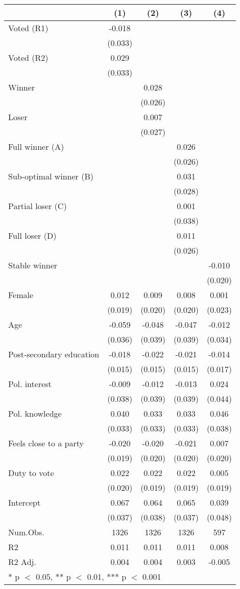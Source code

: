 \begin{table}
\centering
\begin{tabular}[t]{lcccc}
\toprule
  & (1) & (2) & (3) & (4)\\
\midrule
Voted (R1) & -0.018 &  &  & \\
 & (0.033) &  &  \vphantom{1} & \\
Voted (R2) & 0.029 &  &  & \\
 & (0.033) &  &  & \\
Winner &  & 0.028 &  & \\
 &  & (0.026) &  & \\
Loser &  & 0.007 &  & \\
 &  & (0.027) &  & \\
Full winner (A) &  &  & 0.026 & \\
 &  &  & (0.026) \vphantom{1} & \\
Sub-optimal winner (B) &  &  & 0.031 & \\
 &  &  & (0.028) & \\
Partial loser (C) &  &  & 0.001 & \\
 &  &  & (0.038) & \\
Full loser (D) &  &  & 0.011 & \\
 &  &  & (0.026) & \\
Stable winner &  &  &  & -0.010\\
 &  &  &  & (0.020)\\
Female & 0.012 & 0.009 & 0.008 & 0.001\\
 & (0.019) & (0.020) & (0.020) & (0.023)\\
Age & -0.059 & -0.048 & -0.047 & -0.012\\
 & (0.036) & (0.039) & (0.039) & (0.034)\\
Post-secondary education & -0.018 & -0.022 & -0.021 & -0.014\\
 & (0.015) & (0.015) & (0.015) & (0.017)\\
Pol. interest & -0.009 & -0.012 & -0.013 & 0.024\\
 & (0.038) & (0.039) & (0.039) & (0.044)\\
Pol. knowledge & 0.040 & 0.033 & 0.033 & 0.046\\
 & (0.033) & (0.033) & (0.033) & (0.038)\\
Feels close to a party & -0.020 & -0.020 & -0.021 & 0.007\\
 & (0.019) & (0.020) & (0.020) & (0.020)\\
Duty to vote & 0.022 & 0.022 & 0.022 & 0.005\\
 & (0.020) & (0.019) & (0.019) & (0.019)\\
Intercept & 0.067 & 0.064 & 0.065 & 0.039\\
 & (0.037) & (0.038) & (0.037) & (0.048)\\
\midrule
Num.Obs. & 1326 & 1326 & 1326 & 597\\
R2 & 0.011 & 0.011 & 0.011 & 0.008\\
R2 Adj. & 0.004 & 0.004 & 0.003 & -0.005\\
\bottomrule
\multicolumn{5}{l}{\rule{0pt}{1em}* p $<$ 0.05, ** p $<$ 0.01, *** p $<$ 0.001}\\
\end{tabular}
\end{table}
